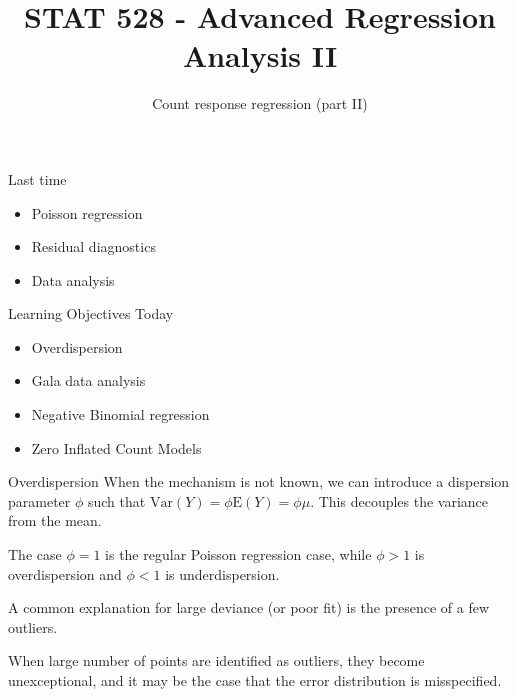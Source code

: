\documentclass[
  ignorenonframetext,
]{beamer}
\title{STAT 528 - Advanced Regression Analysis II}
\author{Count response regression (part II)}
\date{}
\institute{Daniel J. Eck\\
Department of Statistics\\
University of Illinois}
\providecommand{\tightlist}{%
  \setlength{\itemsep}{0pt}\setlength{\parskip}{0pt}}
\begin{document}
\frame{\titlepage}

\begin{frame}
\newcommand{\R}{\mathbb{R}}
\newcommand{\Prob}{\mathbb{P}}
\newcommand{\Proj}{\textbf{P}}
\newcommand{\Hcal}{\mathcal{H}}
\newcommand{\rootn}{\sqrt{n}}
\newcommand{\p}{\mathbf{p}}
\newcommand{\E}{\text{E}}
\newcommand{\Var}{\text{Var}}
\newcommand{\Cov}{\text{Cov}}
\newcommand{\mubf}{\bm{\mu}}
\newcommand{\logit}{\text{logit}}

\newtheorem{cor}{Corollary}
\newtheorem{lem}{Lemma}
\newtheorem{thm}{Theorem}
\newtheorem{defn}{Definition}
\newtheorem{prop}{Proposition}
\end{frame}

\begin{frame}{Last time}
\protect\hypertarget{last-time}{}
\begin{itemize}
\tightlist
\item
  Poisson regression
\item
  Residual diagnostics
\item
  Data analysis
\end{itemize}
\end{frame}

\begin{frame}{Learning Objectives Today}
\protect\hypertarget{learning-objectives-today}{}
\begin{itemize}
\tightlist
\item
  Overdispersion
\item
  Gala data analysis
\item
  Negative Binomial regression
\item
  Zero Inflated Count Models
\end{itemize}
\end{frame}

\begin{frame}{Overdispersion}
\protect\hypertarget{overdispersion}{}
When the mechanism is not known, we can introduce a dispersion parameter
\(\phi\) such that \(\mathrm{Var}(Y) = \phi \mathrm{E}(Y) = \phi\mu\).
This decouples the variance from the mean.

\vspace{12pt}

The case \(\phi = 1\) is the regular Poisson regression case, while
\(\phi > 1\) is overdispersion and \(\phi < 1\) is underdispersion.

\vspace{12pt}

A common explanation for large deviance (or poor fit) is the presence of
a few outliers.

\vspace{12pt}

When large number of points are identified as outliers, they become
unexceptional, and it may be the case that the error distribution is
misspecified.
\end{frame}
\end{document}

